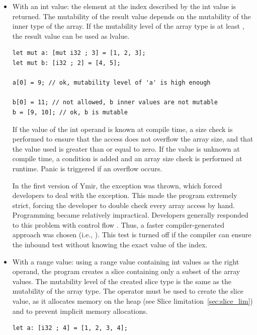 \begin{itemize}
  \setlength\itemsep{-4pt}
\item With an int value: the element at the index described by the int value is
  returned. The mutability of the result value depends on the mutability of the
  inner type of the array. If the mutability level of the array type is at least
  , the result value can be used as lvalue.

  \begin{lstlisting}[style=coloredverbatimError]
let mut a: [mut i32 ; 3] = [1, 2, 3];
let mut b: [i32 ; 2] = [4, 5];

a[0] = 9; // ok, mutability level of 'a' is high enough

b[0] = 11; // not allowed, b inner values are not mutable
b = [9, 10]; // ok, b is mutable
  \end{lstlisting}

  If the value of the int operand is known at compile time, a size check is
  performed to ensure that the access does not overflow the array size, and that
  the value used is greater than or equal to zero. If the value is unknown at
  compile time, a condition is added and an array size check is performed at
  runtime. Panic is triggered if an overflow occurs.

  In the first version of Ymir, the exception
   was thrown, which forced developers to
  deal with the exception. This made the program extremely strict, forcing the
  developer to double check every array access by hand. Programming became
  relatively impractical. Developers generally responded to this problem with
  control flow . Thus, a faster
  compiler-generated approach was chosen (i.e., ). This
  test is turned off if the compiler can ensure the inbound test without knowing
  the exact value of the index.

\item With a range value: using a range value containing int values as the right
  operand, the program creates a slice containing only a subset of the array
  values. The mutability level of the created slice type is the same as the
  mutability of the array type. The  operator must be used to create
  the slice value, as it allocates memory on the heap (see Slice
  limitation~\ref{sec:slice_lim}) and to prevent implicit memory allocations.

  \begin{lstlisting}[style=coloredverbatim]
let a: [i32 ; 4] = [1, 2, 3, 4];


\end{lstlisting}
\end{itemize}
